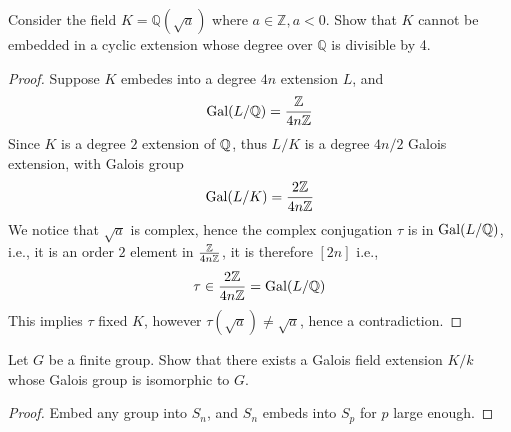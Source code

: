 \begin{prob}[S2009-Q3]
    Consider the field \(K = \mathbb{Q}(\sqrt{a})\) where \(a \in \mathbb{Z}, a < 0\). Show that \(K\) cannot be embedded in a cyclic extension whose degree over \(\mathbb{Q}\) is divisible by 4.
\end{prob}
\begin{proof}
    Suppose $K$ embedes into a degree $4n$ extension $L$, and 
    \begin{equation*}
        \text{Gal}(L/\mathbb{Q})=\frac{\mathbb{Z}}{4n\mathbb{Z}}
    \end{equation*} 
    Since $K$ is a degree $2$ extension of $\mathbb{Q}$, thus $L/K$ is a degree $4n/2$ Galois extension, with Galois group 
    \begin{equation*}
        \text{Gal}(L/K)=\frac{2\mathbb{Z}}{4n\mathbb{Z}}
    \end{equation*}
    We notice that $\sqrt{a}$ is complex, hence the complex conjugation $\tau$ is in $\text{Gal}(L/\mathbb{Q})$, i.e., it is an order $2$ element in $\frac{\mathbb{Z}}{4n\mathbb{Z}}$, it is therefore $[2n]$ i.e., 
    \begin{equation*}
        \tau\in\frac{2\mathbb{Z}}{4n\mathbb{Z}}=\text{Gal}(L/\mathbb{Q})
    \end{equation*}
    This implies $\tau$ fixed $K$, however $\tau(\sqrt{a})\neq\sqrt{a}$, hence a contradiction.
\end{proof}


\begin{prob}[F2000-Q4]
    Let \(G\) be a finite group. Show that there exists a Galois field extension \(K/k\) whose Galois group is isomorphic to \(G\).
\end{prob}
\begin{proof}
    Embed any group into $S_n$, and $S_n$ embeds into $S_p$ for $p$ large enough. 
\end{proof}


